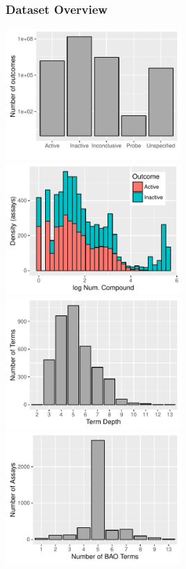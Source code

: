 \documentclass[anchorcolor=blue,linkcolor=blue]{beamer}
\begin{document}
\begin{frame}
  \frametitle{Dataset Overview}
  \begin{center}
  \includegraphics[width=0.5\textwidth]{img-bioassay-outcomes} 
  \includegraphics[width=0.5\textwidth]{img-outcomehistogram} \\
  \includegraphics[width=0.5\textwidth]{img-termdepth}
  \includegraphics[width=0.5\textwidth]{img-termassaycount} \\    
  \end{center}
\end{frame}
\end{document}
